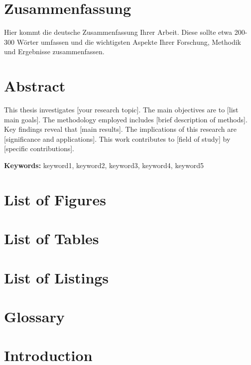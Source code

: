 \documentclass[oneside,bibliography=totocnumbered,BCOR=5mm]{scrbook}
\begin{document}
\chapter*{Zusammenfassung}
Hier kommt die deutsche Zusammenfassung Ihrer Arbeit. Diese sollte etwa 200-300 Wörter umfassen und die wichtigsten Aspekte Ihrer Forschung, Methodik und Ergebnisse zusammenfassen.


\chapter*{Abstract}
This thesis investigates [your research topic]. The main objectives are to [list main goals]. The methodology employed includes [brief description of methods]. Key findings reveal that [main results]. The implications of this research are [significance and applications]. This work contributes to [field of study] by [specific contributions].

\textbf{Keywords:} keyword1, keyword2, keyword3, keyword4, keyword5


\chapter*{List of Figures}
\listoffigures
\chapter*{List of Tables}
\listoftables
\chapter*{List of Listings}
\lstlistoflistings
\chapter*{Glossary}
\printglossary[title=Glossary]

\mainmatter

\chapter{Introduction}
\label{ch:introduction}
\end{document}
